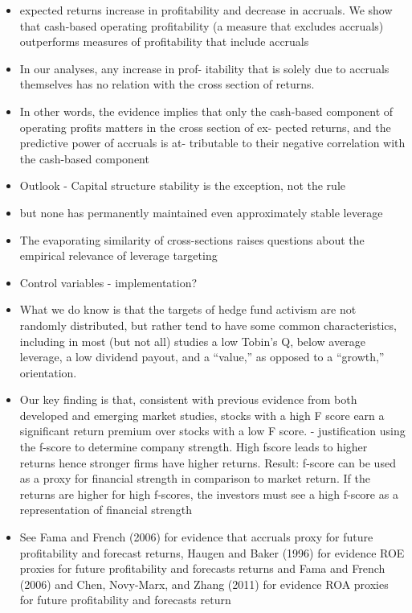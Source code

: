 \documentclass[12pt]{article}
\begin{document}
    \begin{itemize}
        \item expected returns increase in profitability and decrease in accruals. We show that cash-based operating profitability (a measure that excludes accruals) outperforms measures of profitability that include accruals \citet{Ball2016}
        \item In our analyses, any increase in prof- itability that is solely due to accruals themselves has no relation with the cross section of returns.\citet{Ball2016}
        \item In other words, the evidence implies that only the cash-based component of operating profits matters in the cross section of ex- pected returns, and the predictive power of accruals is at- tributable to their negative correlation with the cash-based component \citet{Ball2016}
        \item Outlook - Capital structure stability is the exception, not the rule \citet{Deangelo2015}
        \item but none has permanently maintained even approximately stable leverage \citet{Deangelo2015}
        \item The evaporating similarity of cross-sections raises questions about the empirical relevance of leverage targeting \citet{Deangelo2015}
        \item Control variables - implementation?
        \item What we do know is that the targets of hedge fund activism are not randomly distributed, but rather tend to have some common characteristics, including in most (but not all) studies a low Tobin’s Q, below average leverage, a low dividend payout, and a “value,” as opposed to a “growth,” orientation. \citet{CoffeeJr.2014}
        \item Our key finding is that, consistent with previous evidence from both developed and emerging market studies, stocks with a high F score earn a significant return premium over stocks with a low F score. \citet{Hyde2014} - justification using the f-score to determine company strength. High fscore leads to higher returns hence stronger firms have higher returns. Result: f-score can be used as a proxy for financial strength in comparison to market return. If the returns are higher for high f-scores, the investors must see a high f-score as a representation of financial strength
        \item See Fama and French (2006) for evidence that accruals proxy for future profitability and forecast returns, Haugen and Baker (1996) for evidence ROE proxies for future profitability and forecasts returns and Fama and French (2006) and Chen, Novy-Marx, and Zhang (2011) for evidence ROA proxies for future profitability and forecasts return \citet{Choi2012}

\end{itemize}
\end{document}
